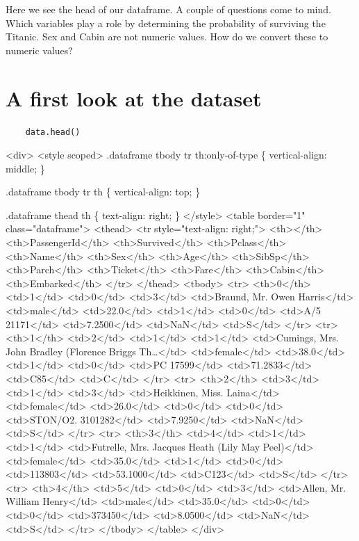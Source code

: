 \documentclass[11pt]{article}
\begin{document}
Here we see the head of our dataframe. A couple of questions come to
mind. Which variables play a role by determining the probability of
surviving the Titanic. Sex and Cabin are not numeric values. How do we
convert these to numeric values?

\section{A first look at the dataset}
\label{a-first-look-at-the-dataset}
\begin{verbatim}
    data.head()
\end{verbatim}

\begin{HTML}
<div>
<style scoped>
    .dataframe tbody tr th:only-of-type \{
	vertical-align: middle;
    \}

.dataframe tbody tr th \{
    vertical-align: top;
\}

    .dataframe thead th \{
	text-align: right;
    \}
</style>
<table border="1" class="dataframe">
  <thead>
    <tr style="text-align: right;">
      <th></th>
      <th>PassengerId</th>
      <th>Survived</th>
      <th>Pclass</th>
      <th>Name</th>
      <th>Sex</th>
      <th>Age</th>
      <th>SibSp</th>
      <th>Parch</th>
      <th>Ticket</th>
      <th>Fare</th>
      <th>Cabin</th>
      <th>Embarked</th>
    </tr>
  </thead>
  <tbody>
    <tr>
      <th>0</th>
      <td>1</td>
      <td>0</td>
      <td>3</td>
      <td>Braund, Mr. Owen Harris</td>
      <td>male</td>
      <td>22.0</td>
      <td>1</td>
      <td>0</td>
      <td>A/5 21171</td>
      <td>7.2500</td>
      <td>NaN</td>
      <td>S</td>
    </tr>
    <tr>
      <th>1</th>
      <td>2</td>
      <td>1</td>
      <td>1</td>
      <td>Cumings, Mrs. John Bradley (Florence Briggs Th\ldots{}</td>
      <td>female</td>
      <td>38.0</td>
      <td>1</td>
      <td>0</td>
      <td>PC 17599</td>
      <td>71.2833</td>
      <td>C85</td>
      <td>C</td>
    </tr>
    <tr>
      <th>2</th>
      <td>3</td>
      <td>1</td>
      <td>3</td>
      <td>Heikkinen, Miss. Laina</td>
      <td>female</td>
      <td>26.0</td>
      <td>0</td>
      <td>0</td>
      <td>STON/O2. 3101282</td>
      <td>7.9250</td>
      <td>NaN</td>
      <td>S</td>
    </tr>
    <tr>
      <th>3</th>
      <td>4</td>
      <td>1</td>
      <td>1</td>
      <td>Futrelle, Mrs. Jacques Heath (Lily May Peel)</td>
      <td>female</td>
      <td>35.0</td>
      <td>1</td>
      <td>0</td>
      <td>113803</td>
      <td>53.1000</td>
      <td>C123</td>
      <td>S</td>
    </tr>
    <tr>
      <th>4</th>
      <td>5</td>
      <td>0</td>
      <td>3</td>
      <td>Allen, Mr. William Henry</td>
      <td>male</td>
      <td>35.0</td>
      <td>0</td>
      <td>0</td>
      <td>373450</td>
      <td>8.0500</td>
      <td>NaN</td>
      <td>S</td>
    </tr>
  </tbody>
</table>
</div>
\end{HTML}
\end{document}
